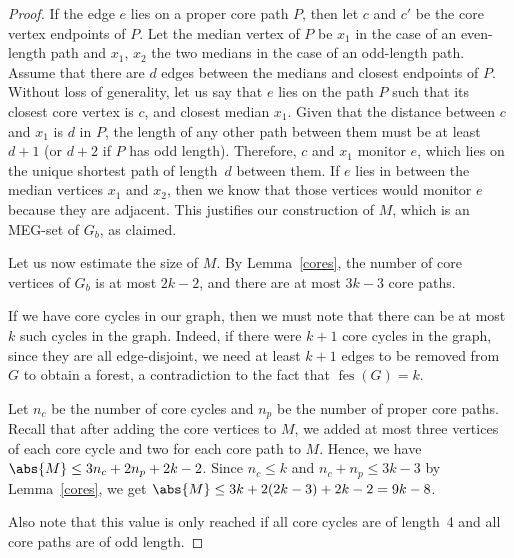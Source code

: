 \documentclass[10pt,a4paper]{article}
\DeclareMathOperator{\fes}{fes}
\begin{document}
\begin{proof}
If the edge $e$ lies on a proper core path $P$, then let $c$ and $c'$ be the core vertex endpoints of $P$. Let the median vertex of $P$ be $x_1$ in the case of an even-length path and $x_1$, $x_2$ the two medians in the case of an odd-length path. Assume that there are $d$ edges between the medians and closest endpoints of $P$. Without loss of generality, let us say that $e$ lies on the path $P$ such that its closest core vertex is $c$, and closest median $x_1$. 
Given that the distance between $c$ and $x_1$ is $d$ in $P$, the length of any other path between them must be at least $d+1$ (or $d+2$ if $P$ has odd length). Therefore, $c$ and $x_1$ monitor $e$, which lies on the unique shortest path of length~$d$ between them. %
If $e$ lies in between the median vertices $x_1$ and $x_2$, then we know that those vertices would monitor $e$ because they are adjacent. %
This justifies our construction of $M$, which is an MEG-set of $G_b$, as claimed.

\medskip

Let us now estimate the size of $M$. By Lemma~\ref{cores}, the number of core vertices of $G_b$ is at most $2k-2$, and there are at most $3k-3$ core paths.

If we have core cycles in our graph, then we must note that there can be at most $k$ such cycles in the graph. Indeed, if there were $k+1$ core cycles in the graph, since they are all edge-disjoint, we need at least $k+1$ edges to be removed from $G$ to obtain a forest, a contradiction to the fact that $\fes(G)=k$.

Let $n_c$ be the number of core cycles and $n_p$ be the number of proper core paths. Recall that after adding the core vertices to $M$, we added at most three vertices of each core cycle and two for each core path to $M$. Hence, we have $\abs{M} \leq 3n_c + 2n_p + 2k-2$. Since $n_c \leq k$ and $n_c + n_p \leq 3k-3$ by Lemma~\ref{cores}, we get $\abs{M} \leq 3k + 2(2k-3) + 2k-2 = 9k-8$.

Also note that this value is only reached if all core cycles are of length~4 and all core paths are of odd length.
\end{proof}
\end{document}
